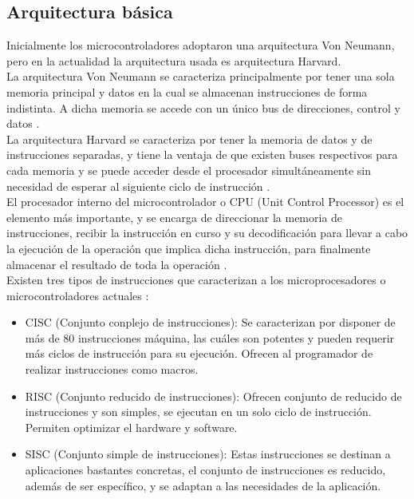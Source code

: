 \subsection{Arquitectura básica}
Inicialmente los microcontroladores adoptaron una arquitectura Von Neumann, pero 
en la actualidad la arquitectura usada es arquitectura Harvard. \\
La arquitectura Von Neumann se caracteriza principalmente por tener una sola 
memoria principal y datos en la cual se almacenan instrucciones de forma 
indistinta. A dicha memoria se accede con un único bus de direcciones, control y 
datos \cite{comparativa_micros, arqui_org_micros}. \\
La arquitectura Harvard se caracteriza por tener la memoria de datos y de 
instrucciones separadas, y tiene la ventaja de que existen buses respectivos 
para cada memoria y se puede acceder desde el procesador simultáneamente sin 
necesidad de esperar al siguiente ciclo de instrucción \cite{arqui_org_micros}. 
\\
El procesador interno del microcontrolador o CPU (Unit Control Processor) es el 
elemento más importante, y se encarga de direccionar la memoria de 
instrucciones, recibir la instrucción en curso y su decodificación para llevar a 
cabo la ejecución de la operación que implica dicha instrucción, para finalmente 
almacenar el resultado de toda la operación \cite{arqui_org_micros}. \\
Existen tres tipos de instrucciones que caracterizan a los microprocesadores o 
microcontroladores actuales \cite{arqui_org_micros}:

\begin{itemize}
	\item CISC (Conjunto conplejo de instrucciones): Se caracterizan por 
	disponer de más de 80 instrucciones máquina, las cuáles son potentes y 
	pueden requerir más ciclos de instrucción para su ejecución. Ofrecen al 
	programador de realizar instrucciones como macros.
	\item RISC (Conjunto reducido de instrucciones): Ofrecen conjunto de 
	reducido de instrucciones y son simples, se ejecutan en un solo ciclo de 
	instrucción. Permiten optimizar el hardware y software.
	\item SISC (Conjunto simple de instrucciones): Estas instrucciones se 
	destinan a aplicaciones bastantes concretas, el conjunto de 
	instrucciones es reducido, además de ser específico, y se adaptan a las 
	necesidades de la aplicación.
\end{itemize}

